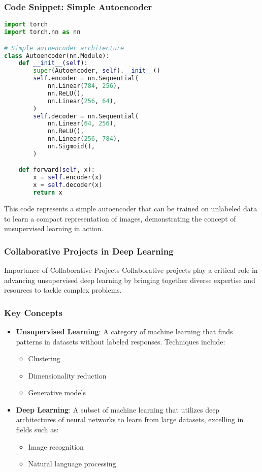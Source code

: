 \documentclass[aspectratio=169]{beamer}
\begin{document}
\begin{frame}[fragile]
    \frametitle{Code Snippet: Simple Autoencoder}
    \begin{lstlisting}[language=Python]
import torch
import torch.nn as nn

# Simple autoencoder architecture
class Autoencoder(nn.Module):
    def __init__(self):
        super(Autoencoder, self).__init__()
        self.encoder = nn.Sequential(
            nn.Linear(784, 256),
            nn.ReLU(),
            nn.Linear(256, 64),
        )
        self.decoder = nn.Sequential(
            nn.Linear(64, 256),
            nn.ReLU(),
            nn.Linear(256, 784),
            nn.Sigmoid(),
        )

    def forward(self, x):
        x = self.encoder(x)
        x = self.decoder(x)
        return x
    \end{lstlisting}
    This code represents a simple autoencoder that can be trained on unlabeled data to learn a compact representation of images, demonstrating the concept of unsupervised learning in action.
\end{frame}

\begin{frame}[fragile]
    \frametitle{Collaborative Projects in Deep Learning}
    \begin{block}{Importance of Collaborative Projects}
        Collaborative projects play a critical role in advancing unsupervised deep learning by bringing together diverse expertise and resources to tackle complex problems.
    \end{block}
\end{frame}

\begin{frame}[fragile]
    \frametitle{Key Concepts}
    \begin{itemize}
        \item \textbf{Unsupervised Learning}: 
            A category of machine learning that finds patterns in datasets without labeled responses. Techniques include:
            \begin{itemize}
                \item Clustering
                \item Dimensionality reduction
                \item Generative models
            \end{itemize}
        
        \item \textbf{Deep Learning}: 
            A subset of machine learning that utilizes deep architectures of neural networks to learn from large datasets, excelling in fields such as:
            \begin{itemize}
                \item Image recognition
                \item Natural language processing
            \end{itemize}
    \end{itemize}
\end{frame}
\end{document}
